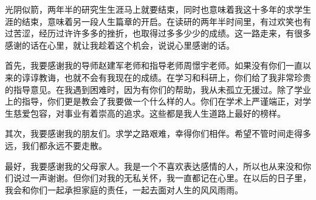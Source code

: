 
\begin{thanks}
光阴似箭，两年半的研究生生涯马上就要结束，同时也意味着我这十多年的求学生涯的结束，意味着另一段人生篇章的开启。在读研的两年半时间里，有过欢笑也有过苦涩，经历过许许多多的挫折，也取得过多多少少的成绩。这一路走来，有很多感谢的话在心里，就让我趁着这个机会，说说心里感谢的话。

首先，我要感谢我的导师赵建军老师和指导老师周憬宇老师。如果没有你们一直以来的谆谆教诲，也就不会有我现在的成绩。在学习和科研上，你们给了我非常珍贵的指导意见。在我遇到困难时，因为有你们的帮助，我从未孤立无援过。除了学业上的指导，你们更是教会了我要做一个什么样的人。你们在学术上严谨端正，对学生慈爱包容，对事业有着崇高的追求。这些都是我人生道路上最好的榜样。

其次，我要感谢我的朋友们。求学之路艰难，幸得你们相伴。希望不管时间走得多远，我们都永远不要走散。

最好，我要感谢我的父母家人。我是一个不喜欢表达感情的人，所以也从来没和你们说过一声谢谢。但你们对我的无私关怀，我一直都记在心里。在以后的日子里，我会和你们一起承担家庭的责任，一起去面对人生的风风雨雨。

\end{thanks}
